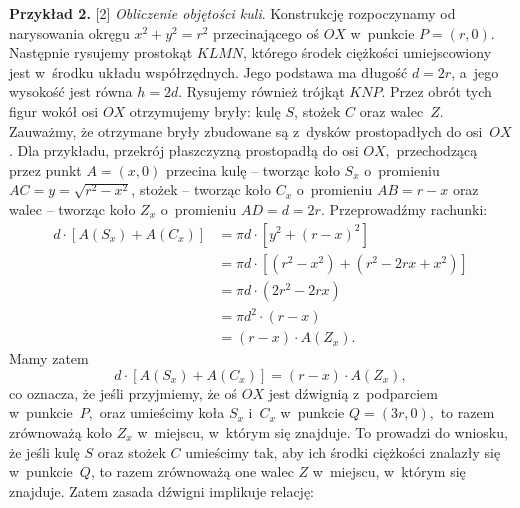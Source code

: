{\bf Przykład 2.} [2] {\it Obliczenie objętości kuli}. 
Konstrukcję rozpoczynamy od narysowania okręgu $x^2+y^2=r^2$ przecinającego oś $OX$ w~punkcie 
$P=(r,0)$. Następnie rysujemy prostokąt $KLMN$, którego środek ciężkości
umiejscowiony jest w~środku układu współrzędnych. Jego podstawa ma długość
$d=2r$, a~jego wysokość jest równa $h=2d$. Rysujemy również trójkąt $KNP$. Przez
obrót tych figur wokół osi $OX$ otrzymujemy bryły: kulę $S$, stożek $C$ oraz
walec~$Z$. Zauważmy, że otrzymane bryły zbudowane są z~dysków prostopadłych do osi~$OX$. Dla przykładu, przekrój płaszczyzną prostopadłą do osi $OX,$ przechodzącą przez punkt $A=(x,0)$ przecina kulę – tworząc koło $S_x$ o~promieniu ${AC=y=\sqrt{r^2-x^2}}$, stożek – tworząc koło $C_x$ o~promieniu $AB=r-x$ oraz walec – tworząc koło $Z_x$ o~promieniu $AD=d=2r$. Przeprowadźmy rachunki:
\begin{align*}
d \cdot [A(S_x)+A(C_x)] &= \pi d \cdot [y^2+(r-x)^2] \\&= \pi d \cdot [(r^2-x^2)+(r^2-2rx+x^2)] \\&= 
\pi d \cdot (2r^2-2rx) \\&= \pi d^2 \cdot (r-x) \\&= (r-x) \cdot A(Z_x).
\end{align*} 
Mamy zatem
\begin{equation*}
d \cdot [A(S_x)+A(C_x)] = (r-x) \cdot A(Z_x),
\end{equation*}
co oznacza, że jeśli przyjmiemy, że oś $OX$ jest dźwignią z~podparciem w~punkcie~$P,$ oraz umieścimy koła $S_x$ i~$C_x$ w~punkcie $Q=(3r,0),$ to razem zrównoważą koło $Z_x$ w~miejscu, w~którym się znajduje. To prowadzi do wniosku, że jeśli kulę $S$ oraz stożek $C$ umieścimy tak, aby ich środki ciężkości znalazły się w~punkcie~$Q$, to razem zrównoważą one walec $Z$ w~miejscu, w~którym się znajduje. Zatem zasada dźwigni implikuje relację:
